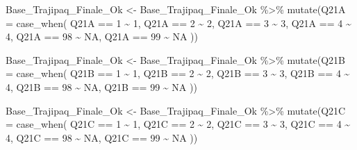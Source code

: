 \documentclass[
]{article}
\newenvironment{Shaded}{\begin{snugshade}}{\end{snugshade}}
\newcommand{\AttributeTok}[1]{\textcolor[rgb]{0.77,0.63,0.00}{#1}}
\newcommand{\ConstantTok}[1]{\textcolor[rgb]{0.00,0.00,0.00}{#1}}
\newcommand{\DecValTok}[1]{\textcolor[rgb]{0.00,0.00,0.81}{#1}}
\newcommand{\FunctionTok}[1]{\textcolor[rgb]{0.00,0.00,0.00}{#1}}
\newcommand{\NormalTok}[1]{#1}
\newcommand{\OtherTok}[1]{\textcolor[rgb]{0.56,0.35,0.01}{#1}}
\newcommand{\SpecialCharTok}[1]{\textcolor[rgb]{0.00,0.00,0.00}{#1}}
\begin{document}
\begin{Shaded}
\begin{Highlighting}[]
\NormalTok{Base\_Trajipaq\_Finale\_Ok }\OtherTok{\textless{}{-}}
\NormalTok{  Base\_Trajipaq\_Finale\_Ok }\SpecialCharTok{\%\textgreater{}\%}
  \FunctionTok{mutate}\NormalTok{(}\AttributeTok{Q21A =} \FunctionTok{case\_when}\NormalTok{(}
\NormalTok{    Q21A }\SpecialCharTok{==} \DecValTok{1} \SpecialCharTok{\textasciitilde{}} \DecValTok{1}\NormalTok{,}
\NormalTok{    Q21A }\SpecialCharTok{==} \DecValTok{2} \SpecialCharTok{\textasciitilde{}} \DecValTok{2}\NormalTok{,}
\NormalTok{    Q21A }\SpecialCharTok{==} \DecValTok{3} \SpecialCharTok{\textasciitilde{}} \DecValTok{3}\NormalTok{,}
\NormalTok{    Q21A }\SpecialCharTok{==} \DecValTok{4} \SpecialCharTok{\textasciitilde{}} \DecValTok{4}\NormalTok{,}
\NormalTok{    Q21A }\SpecialCharTok{==} \DecValTok{98} \SpecialCharTok{\textasciitilde{}} \ConstantTok{NA}\NormalTok{,}
\NormalTok{    Q21A }\SpecialCharTok{==} \DecValTok{99} \SpecialCharTok{\textasciitilde{}} \ConstantTok{NA}
\NormalTok{  ))}

\NormalTok{Base\_Trajipaq\_Finale\_Ok }\OtherTok{\textless{}{-}}
\NormalTok{  Base\_Trajipaq\_Finale\_Ok }\SpecialCharTok{\%\textgreater{}\%}
  \FunctionTok{mutate}\NormalTok{(}\AttributeTok{Q21B =} \FunctionTok{case\_when}\NormalTok{(}
\NormalTok{    Q21B }\SpecialCharTok{==} \DecValTok{1} \SpecialCharTok{\textasciitilde{}} \DecValTok{1}\NormalTok{,}
\NormalTok{    Q21B }\SpecialCharTok{==} \DecValTok{2} \SpecialCharTok{\textasciitilde{}} \DecValTok{2}\NormalTok{,}
\NormalTok{    Q21B }\SpecialCharTok{==} \DecValTok{3} \SpecialCharTok{\textasciitilde{}} \DecValTok{3}\NormalTok{,}
\NormalTok{    Q21B }\SpecialCharTok{==} \DecValTok{4} \SpecialCharTok{\textasciitilde{}} \DecValTok{4}\NormalTok{,}
\NormalTok{    Q21B }\SpecialCharTok{==} \DecValTok{98} \SpecialCharTok{\textasciitilde{}} \ConstantTok{NA}\NormalTok{,}
\NormalTok{    Q21B }\SpecialCharTok{==} \DecValTok{99} \SpecialCharTok{\textasciitilde{}} \ConstantTok{NA}
\NormalTok{  ))}

\NormalTok{Base\_Trajipaq\_Finale\_Ok }\OtherTok{\textless{}{-}}
\NormalTok{  Base\_Trajipaq\_Finale\_Ok }\SpecialCharTok{\%\textgreater{}\%}
  \FunctionTok{mutate}\NormalTok{(}\AttributeTok{Q21C =} \FunctionTok{case\_when}\NormalTok{(}
\NormalTok{    Q21C }\SpecialCharTok{==} \DecValTok{1} \SpecialCharTok{\textasciitilde{}} \DecValTok{1}\NormalTok{,}
\NormalTok{    Q21C }\SpecialCharTok{==} \DecValTok{2} \SpecialCharTok{\textasciitilde{}} \DecValTok{2}\NormalTok{,}
\NormalTok{    Q21C }\SpecialCharTok{==} \DecValTok{3} \SpecialCharTok{\textasciitilde{}} \DecValTok{3}\NormalTok{,}
\NormalTok{    Q21C }\SpecialCharTok{==} \DecValTok{4} \SpecialCharTok{\textasciitilde{}} \DecValTok{4}\NormalTok{,}
\NormalTok{    Q21C }\SpecialCharTok{==} \DecValTok{98} \SpecialCharTok{\textasciitilde{}} \ConstantTok{NA}\NormalTok{,}
\NormalTok{    Q21C }\SpecialCharTok{==} \DecValTok{99} \SpecialCharTok{\textasciitilde{}} \ConstantTok{NA}
\NormalTok{  ))}


\end{Highlighting}
\end{Shaded}
\end{document}
